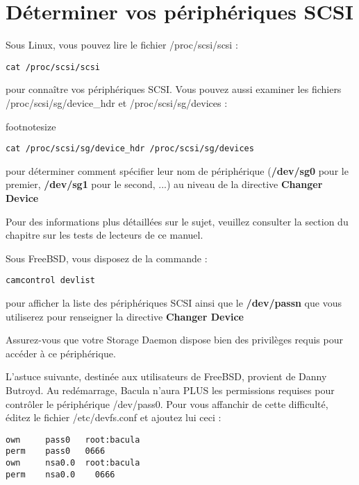 \label{SCSI devices}
\section*{D\'eterminer vos p\'eriph\'eriques SCSI}

Sous Linux, vous pouvez lire le fichier /proc/scsi/scsi :

\footnotesize
\begin{verbatim}
cat /proc/scsi/scsi
\end{verbatim}
\normalsize

pour conna\^itre vos p\'eriph\'eriques SCSI. Vous pouvez aussi examiner les fichiers 
/proc/scsi/sg/device\_hdr et /proc/scsi/sg/devices :

footnotesize
\begin{verbatim}
cat /proc/scsi/sg/device_hdr /proc/scsi/sg/devices
\end{verbatim}
\normalsize

pour d\'eterminer comment sp\'ecifier leur nom de p\'eriph\'erique ({\bf /dev/sg0} 
pour le premier, {\bf /dev/sg1} pour le second, ...) au niveau de 
la directive {\bf Changer Device}

Pour des informations plus d\'etaill\'ees sur le sujet, veuillez consulter la 
section  du chapitre sur les tests 
de lecteurs de ce manuel.

Sous FreeBSD, vous disposez de la commande :

\footnotesize
\begin{verbatim}
camcontrol devlist
\end{verbatim}
\normalsize

pour afficher la liste des p\'eriph\'eriques SCSI ainsi que le {\bf /dev/passn} 
que vous utiliserez pour renseigner la directive {\bf Changer Device} 

Assurez-vous que votre Storage Daemon dispose bien des privil\`eges requis 
pour acc\'eder \`a ce p\'eriph\'erique.

L'astuce suivante, destin\'ee aux utilisateurs de FreeBSD, provient de 
Danny Butroyd. Au red\'emarrage, Bacula n'aura PLUS les permissions 
requises pour contr\^oler le p\'eriph\'erique /dev/pass0. Pour vous 
affanchir de cette difficult\'e, \'editez le fichier /etc/devfs.conf  et 
ajoutez lui ceci :

\footnotesize
\begin{verbatim}
own     pass0   root:bacula
perm    pass0   0666
own     nsa0.0  root:bacula
perm    nsa0.0    0666
\end{verbatim}
\normalsize

